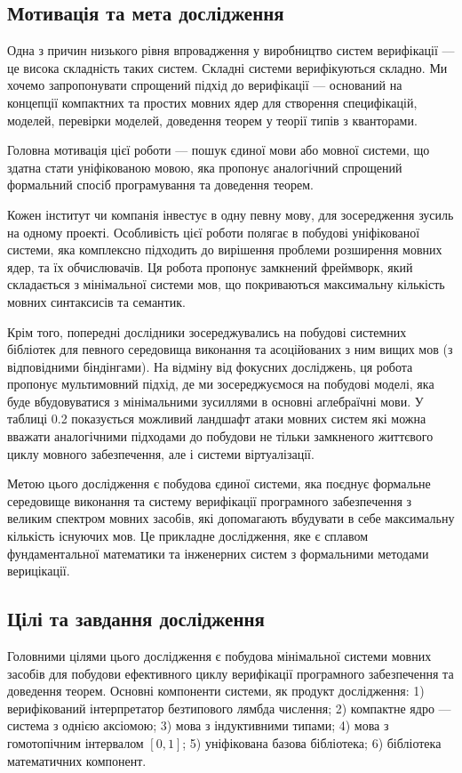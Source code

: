 \subsection{Мотивація та мета дослідження}
Одна з причин низького рівня впровадження у виробництво систем
верифікації --- це висока складність таких систем. Складні системи
верифікуються складно. Ми хочемо запропонувати спрощений
підхід до верифікації --- оснований на концепції компактних
та простих мовних ядер для створення специфікацій, моделей,
перевірки моделей, доведення теорем у теорії типів з кванторами.

Головна мотивація цієї роботи --- пошук єдиної мови або мовної системи,
що здатна стати уніфікованою мовою, яка пропонує аналогічний спрощений
формальний спосіб програмування та доведення теорем.

Кожен інститут чи компанія інвестує в одну певну мову, для зосередження зусиль на одному проекті.
Особливість цієї роботи полягає в побудові уніфікованої системи, яка комплексно підходить
до вирішення проблеми розширення мовних ядер, та їх обчислювачів. Ця робота
пропонує замкнений фреймворк, який складається з мінімальної системи мов,
що покриваються максимальну кількість мовних синтаксисів та семантик.

Крім того, попередні дослідники зосереджувались на побудові системних бібліотек для
певного середовища виконання та асоційованих з ним вищих мов (з відповідними біндінгами).
На відміну від фокусних досліджень, ця робота пропонує мультимовний підхід,
де ми зосереджуємося на побудові моделі, яка буде вбудовуватися з мінімальними
зусиллями в основні аглебраїчні мови. У таблиці 0.2 показується можливий ландшафт атаки
мовних систем які можна вважати аналогічними підходами до побудови не тільки замкненого
життєвого циклу мовного забезпечення, але і системи віртуалізації.

Метою цього дослідження є побудова єдиної системи, яка поєднує формальне середовище
виконання та систему верифікації програмного забезпечення з великим спектром мовних
засобів, які допомагають вбудувати в себе максимальну кількість існуючих мов.
Це прикладне дослідження, яке є сплавом фундаментальної математики та інженерних
систем з формальними методами верицікації.

\subsection{Цілі та завдання дослідження}
Головними цілями цього дослідження є побудова мінімальної системи
мовних засобів для побудови ефективного циклу верифікації програмного
забезпечення та доведення теорем. Основні компоненти системи, як продукт дослідження:
1) верифікований інтерпретатор безтипового лямбда числення;
2) компактне ядро --- система з однією аксіомою;
3) мова з індуктивними типами;
4) мова з гомотопічним інтервалом $[0,1]$;
5) уніфікована базова бібліотека;
6) бібліотека математичних компонент.

